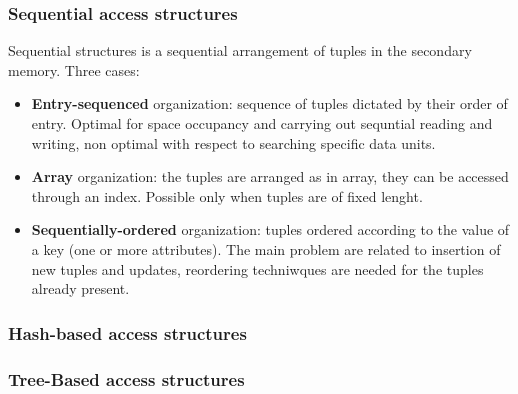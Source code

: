 \subsubsection{Sequential access structures}
Sequential structures is a sequential arrangement of tuples in the secondary memory.\newline
\newline
Three cases:
\begin{itemize}
    \item \textbf{Entry-sequenced} organization: sequence of tuples dictated by their order of entry. Optimal for space occupancy and carrying out sequntial reading and writing, non optimal with respect to searching specific data units.
    \item \textbf{Array} organization: the tuples are arranged as in array, they can be accessed through an index. Possible only when tuples are of fixed lenght.
    \item \textbf{Sequentially-ordered} organization: tuples ordered according to the value of a key (one or more attributes). The main problem are related to insertion of new tuples and updates, reordering techniwques are needed for the tuples already present.
\end{itemize}
\subsubsection{Hash-based access structures}
\subsubsection{Tree-Based access structures}
